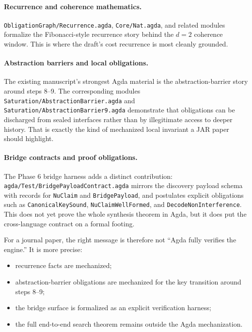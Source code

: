 \documentclass[11pt,a4paper]{article}
\begin{document}
\paragraph{Recurrence and coherence mathematics.}
\texttt{ObligationGraph/Recurrence.agda}, \texttt{Core/Nat.agda}, and related modules formalize the Fibonacci-style recurrence story behind the $d=2$ coherence window. This is where the draft's cost recurrence is most cleanly grounded.

\paragraph{Abstraction barriers and local obligations.}
The existing manuscript's strongest Agda material is the abstraction-barrier story around steps 8--9. The corresponding modules
\texttt{Saturation/AbstractionBarrier.agda} and
\texttt{Saturation/AbstractionBarrier9.agda}
demonstrate that obligations can be discharged from sealed interfaces rather than by illegitimate access to deeper history. That is exactly the kind of mechanized local invariant a JAR paper should highlight.

\paragraph{Bridge contracts and proof obligations.}
The Phase 6 bridge harness adds a distinct contribution: \texttt{agda/Test/BridgePayloadContract.agda} mirrors the discovery payload schema with records for \texttt{NuClaim} and \texttt{BridgePayload}, and postulates explicit obligations such as \texttt{CanonicalKeySound}, \texttt{NuClaimWellFormed}, and \texttt{DecodeNonInterference}. This does not yet prove the whole synthesis theorem in Agda, but it does put the cross-language contract on a formal footing.

For a journal paper, the right message is therefore not ``Agda fully verifies the engine.'' It is more precise:
\begin{itemize}[nosep]
  \item recurrence facts are mechanized;
  \item abstraction-barrier obligations are mechanized for the key transition around steps 8--9;
  \item the bridge surface is formalized as an explicit verification harness;
  \item the full end-to-end search theorem remains outside the Agda mechanization.
\end{itemize}
\end{document}
